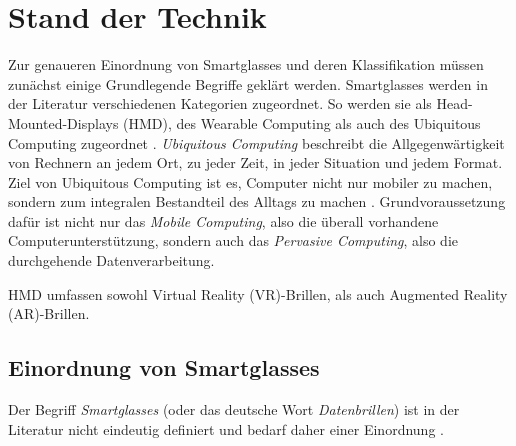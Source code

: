 %
%
%
%
%
%
\chapter{Stand der Technik}
\label{sec:Stand_der_Technik}
Zur genaueren Einordnung von Smartglasses und deren Klassifikation müssen zunächst einige Grundlegende Begriffe geklärt werden. Smartglasses werden in der Literatur verschiedenen Kategorien zugeordnet. So werden sie als Head-Mounted-Displays (HMD), des Wearable Computing als auch des Ubiquitous Computing zugeordnet \cite[S.~20]{ThomasDirkMetzgerHelmutNiegemannHrsg2018}. \emph{Ubiquitous Computing} beschreibt die Allgegenwärtigkeit von Rechnern an jedem Ort, zu jeder Zeit, in jeder Situation und jedem Format. Ziel von Ubiquitous Computing ist es, Computer nicht nur mobiler zu machen, sondern zum integralen Bestandteil des Alltags zu machen \cite[S.~24]{Schwenke2016}. Grundvoraussetzung dafür ist nicht nur das \emph{Mobile Computing}, also die überall vorhandene Computerunterstützung, sondern auch das \emph{Pervasive Computing}, also die durchgehende Datenverarbeitung. 

HMD umfassen sowohl Virtual Reality (VR)-Brillen, als auch Augmented Reality (AR)-Brillen.
%
%
%
%
%
%
\section{Einordnung von Smartglasses}
\label{sec:Einordnung_von_Smartglasses}
Der Begriff \emph{Smartglasses} (oder das deutsche Wort \emph{Datenbrillen}) ist in der Literatur nicht eindeutig definiert und bedarf daher einer Einordnung \cite[S.~26]{Schwenke2016}.
%
